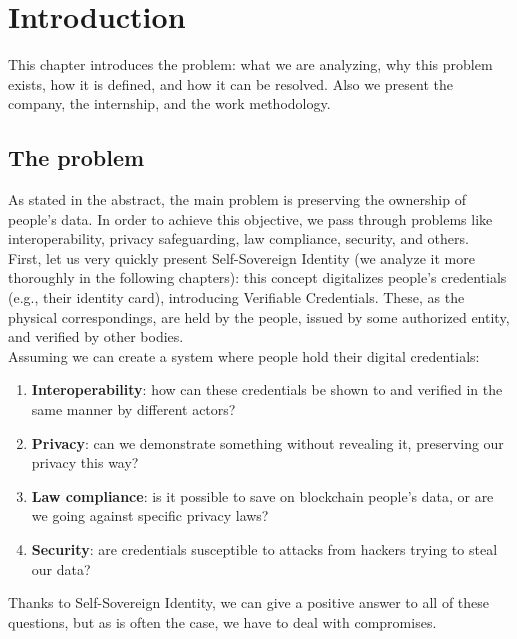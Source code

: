 
\chapter{Introduction}
This chapter introduces the problem: what we are analyzing, why 
this problem exists, how it is defined, and how it can be resolved. 
Also we present the company, the internship, and the work 
methodology.
\section{The problem}
As stated in the abstract, the main problem is preserving the ownership 
of people's data. In order to achieve this objective, we pass through 
problems like interoperability, privacy safeguarding, law compliance, security,
and others.
\vspace*{0.3cm}\\
First, let us very quickly present Self-Sovereign Identity (we analyze it more 
thoroughly in the following chapters): this concept digitalizes people's credentials
(e.g., their identity card), introducing Verifiable Credentials. These, as the 
physical correspondings, are held by the people, issued by some authorized entity,
and verified by other bodies.
\vspace*{0.3cm}\\
Assuming we can create a system where people hold their digital credentials:
\begin{enumerate}
    \setlength\itemsep{-0.3em}
    \item \textbf{Interoperability}: how can these credentials be shown to and 
    verified in the same manner by different actors?
    \item \textbf{Privacy}: can we demonstrate something without revealing it, 
    preserving our privacy this way?
    \item \textbf{Law compliance}: is it possible to save on blockchain people's
    data, or are we going against specific privacy laws?
    \item \textbf{Security}: are credentials susceptible to attacks from hackers 
    trying to steal our data?
\end{enumerate}
Thanks to Self-Sovereign Identity, we can give a positive answer to all
of these questions, but as is often the case, we have to deal with 
compromises.

